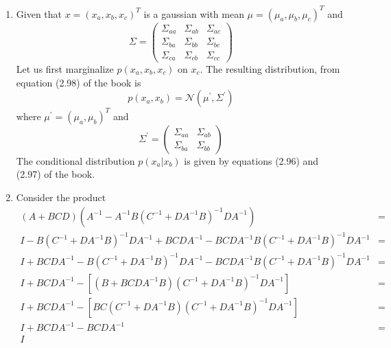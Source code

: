 \begin{enumerate}
\item Given that $x = (x_a, x_b, x_c)^T$ is a gaussian with mean $\mu = (\mu_a, \mu_b, \mu_c)^T$ and
\[
\Sigma = \begin{pmatrix}\Sigma_{aa} & \Sigma_{ab} & \Sigma_{ac} \\
\Sigma_{ba} & \Sigma_{bb} & \Sigma_{bc} \\
\Sigma_{ca} & \Sigma_{cb} & \Sigma_{cc}
\end{pmatrix}
\]
Let us first marginalize $p(x_a, x_b, x_c)$ on $x_c$. The resulting distribution, from equation (2.98)
of the book is
\[
p(x_a, x_b) = \mathcal{N}(\mu^\prime, \Sigma^\prime)
\]
where $\mu^\prime = (\mu_a, \mu_b)^T$ and 
\[
\Sigma^\prime = \begin{pmatrix} \Sigma_{aa} & \Sigma_{ab} \\
\Sigma_{ba} & \Sigma_{bb}
\end{pmatrix}
\]
The conditional distribution $p(x_a | x_b)$ is given by equations (2.96) and (2.97) of the book.

\item Consider the product
\begin{eqnarray*}
(A + BCD)(A^{-1} - A^{-1}B(C^{-1} + DA^{-1}B)^{-1}DA^{-1}) &=& \\
I - B(C^{-1} + DA^{-1}B)^{-1}DA^{-1} + BCDA^{-1} - BCDA^{-1}B(C^{-1} + DA^{-1}B)^{-1}DA^{-1} &=& \\
I + BCDA^{-1} - B(C^{-1} + DA^{-1}B)^{-1}DA^{-1} - BCDA^{-1}B(C^{-1} + DA^{-1}B)^{-1}DA^{-1} &=& \\
I + BCDA^{-1} - \left[(B + BCDA^{-1}B)(C^{-1} + DA^{-1}B)^{-1}DA^{-1}\right] &=& \\
I + BCDA^{-1} - \left[BC(C^{-1} + DA^{-1}B)(C^{-1} + DA^{-1}B)^{-1}DA^{-1}\right] &=& \\
I + BCDA^{-1} - BCDA^{-1} &=& \\
I
\end{eqnarray*}


\end{enumerate}
